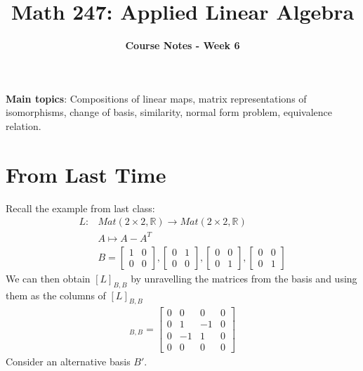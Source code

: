 \documentclass[a4paper, 12pt]{article}
\title{\textbf{Math 247: Applied Linear Algebra} \vspace{-2ex}}
\author{\textbf{Course Notes - Week 6} \vspace{-2ex}}
\date{}
\renewcommand{\arraystretch}{1.0}
\theoremstyle{definition}
\theoremstyle{definition}
\theoremstyle{definition}
\theoremstyle{definition}
\begin{document}
\maketitle
\textbf{Main topics}: Compositions of linear maps, matrix representations of isomorphisms, change of basis, similarity, normal form problem, equivalence relation. 

\pagestyle{fancy}
\rhead{}
\lfoot{}
\cfoot{}
\renewcommand{\headrulewidth}{0.4pt}
\renewcommand{\footrulewidth}{0.4pt}
\setlength{\tabcolsep}{0.5em} %
{\renewcommand{\arraystretch}{1.2}%

\section{From Last Time} 
Recall the example from last class:
\begin{align*}
	L: &  Mat(2 \times 2, \mathbb{R}) \rightarrow Mat(2 \times 2, \mathbb{R}) \\
	& A \mapsto A - A^T \\
	& B = \begin{bmatrix}
		1 & 0 \\
		0 & 0 
	\end{bmatrix}, \begin{bmatrix}
		0 & 1 \\
		0 & 0 
	\end{bmatrix}, \begin{bmatrix}
		0 & 0 \\
		0 & 1
	\end{bmatrix}, \begin{bmatrix}
		0 & 0 \\
		0 & 1 
	\end{bmatrix}
\end{align*}
We can then obtain $[L]_{B,B}$ by unravelling the matrices from the basis and using them as the columns of $[L]_{B,B}$
\begin{align*}
	[L]_{B,B} = \begin{bmatrix}
		0 & 0 & 0 & 0 \\
		0 & 1 & -1 & 0 \\
		0 & -1 & 1 & 0 \\
		0 & 0 & 0 & 0 
	\end{bmatrix}
\end{align*}
Consider an alternative basis $B'$. 
\begin{align*}

\end{align*}}
\end{document}
